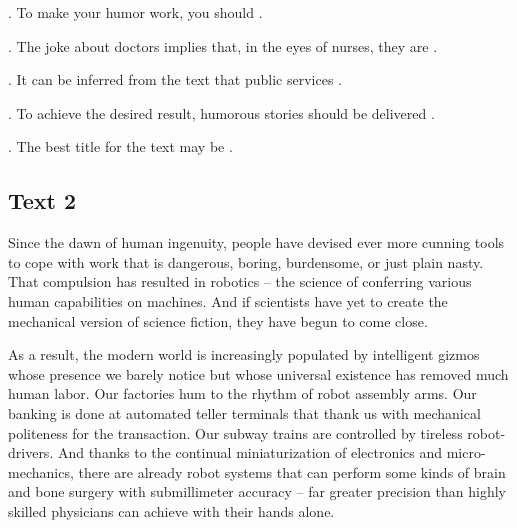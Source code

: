 \begin{questions} 
.	To make your humor work, you should \ltk{}.\\

.	The joke about doctors implies that, in the eyes of nurses, they are \ltk{}.\\

.	It can be inferred from the text that public services \ltk{}.\\

.	To achieve the desired result, humorous stories should be delivered \ltk{}.\\

.	The best title for the text may be \ltk{}.\\
\end{questions}

\subsection{Text 2}
Since the dawn of human ingenuity, people have devised ever more cunning tools to cope with work that is dangerous, boring, burdensome, or just plain nasty. That compulsion has resulted in robotics -- the science of conferring various human capabilities on machines. And if scientists have yet to create the mechanical version of science fiction, they have begun to come close.

As a result, the modern world is increasingly populated by intelligent gizmos whose presence we barely notice but whose universal existence has removed much human labor. Our factories hum to the rhythm of robot assembly arms. Our banking is done at automated teller terminals that thank us with mechanical politeness for the transaction. Our subway trains are controlled by tireless robot-drivers. And thanks to the continual miniaturization of electronics and micro-mechanics, there are already robot systems that can perform some kinds of brain and bone surgery with submillimeter accuracy -- far greater precision than highly skilled physicians can achieve with their hands alone.

